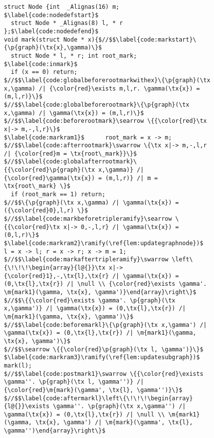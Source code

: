 \begin{figure}[t]
  \begin{lstlisting}[multicols=2]
struct Node {int  _Alignas(16) m; $\label{code:nodedefstart}$
  struct Node * _Alignas(8) l, * r };$\label{code:nodedefend}$
void mark(struct Node * x){$//$$\label{code:markstart}\{\p{graph}(\tx{x},\gamma)\}$
  struct Node * l, * r; int root_mark; $\label{code:inmark}$
  if (x == 0) return;
$//$$\label{code:globalbeforerootmarkwithex}\{\p{graph}(\tx x,\gamma) /| {\color{red}\exists m,l,r. \gamma(\tx{x}) = (m,l,r)}\}$
$//$$\label{code:globalbeforerootmark}\{\p{graph}(\tx x,\gamma) /| \gamma(\tx{x}) = (m,l,r)\}$
$//$$\label{code:beforerootmark}\searrow \{{\color{red}\tx x|-> m,-,l,r}\}$
$\label{code:markram1}$      root_mark = x -> m;
$//$$\label{code:afterrootmark}\swarrow \{\tx x|-> m,-,l,r /| {\color{red}m = \tx{root\_mark}}\}$
$//$$\label{code:globalafterrootmark}\{{\color{red}\p{graph}(\tx x,\gamma)} /| {\color{red}\gamma(\tx{x}) = (m,l,r)} /| m = \tx{root\_mark} \}$
  if (root_mark == 1) return;
$//$$\{\p{graph}(\tx x,\gamma) /| \gamma(\tx{x}) = ({\color{red}0},l,r) \}$
$//$$\label{code:markbeforetripleramify}\searrow \{{\color{red}\tx x|-> 0,-,l,r} /| \gamma(\tx{x}) = (0,l,r)\}$      
$\label{code:markram2}\ramify(\ref{lem:updategraphnode})$  l = x -> l; r = x -> r; x -> m = 1;
$//$$\label{code:markaftertripleramify}\swarrow \left\{\!\!\!\begin{array}{l@{}}\tx x|-> {\color{red}1},-,\tx{l},\tx{r} /| \gamma(\tx{x}) = (0,\tx{l},\tx{r}) /| \null \\ {\color{red}\exists \gamma'. \m{mark1}(\gamma, \tx{x}, \gamma')}\end{array}\right\}$
$//$$\{{\color{red}\exists \gamma'. \p{graph}(\tx x,\gamma')} /| \gamma(\tx{x}) = (0,\tx{l},\tx{r}) /| \m{mark1}(\gamma, \tx{x}, \gamma')\}$
$//$$\label{code:beforemarkl}\{\p{graph}(\tx x,\gamma') /| \gamma(\tx{x}) = (0,\tx{l},\tx{r}) /| \m{mark1}(\gamma, \tx{x}, \gamma')\}$
$//$$\searrow \{{\color{red}\p{graph}(\tx l, \gamma')}\}$
$\label{code:markram3}\ramify(\ref{lem:updatesubgraph})$      mark(l);
$//$$\label{code:postmark1}\swarrow \{{\color{red}\exists \gamma''. \p{graph}(\tx l, \gamma'')} /| {\color{red}\m{mark}(\gamma', \tx{l}, \gamma'')}\}$
$//$$\label{code:aftermarkl}\left\{\!\!\!\begin{array}{l@{}}\exists \gamma''. \p{graph}(\tx x,\gamma'') /| \gamma(\tx{x}) = (0,\tx{l},\tx{r}) /| \null \\ \m{mark1}(\gamma, \tx{x}, \gamma') /| \m{mark}(\gamma', \tx{l}, \gamma'')\end{array}\right\}$

\end{lstlisting}
\end{figure}
